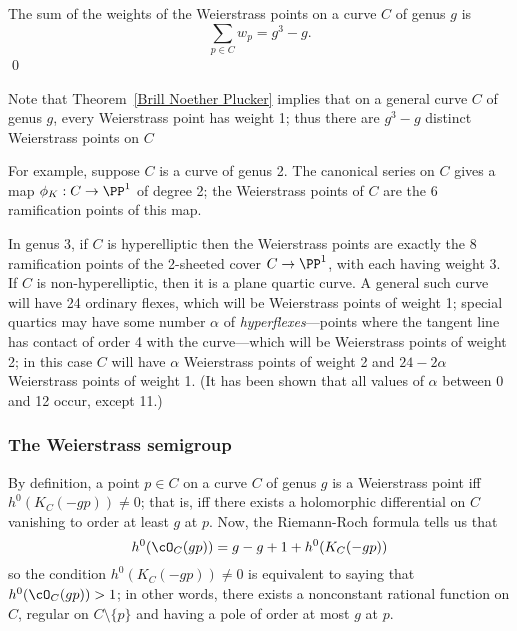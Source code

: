 \begin{corollary}\label{plucker formula}
The sum of the weights of the Weierstrass points on a curve $C$ of genus $g$ is
$$
\sum_{p \in C} w_p = g^3-g.
$$\qed
\end{corollary}

Note that Theorem~\ref{Brill Noether Plucker} implies that on a general curve $C$ of genus $g$, every Weierstrass point has weight 1; thus there are $g^3-g$ distinct Weierstrass points on $C$


For example, suppose $C$ is a curve of genus 2. The canonical series on $C$ gives a map $\phi_K : C \to \PP^1$ of degree 2; the Weierstrass points of $C$ are the 6 ramification points of this map. 

In genus 3, if $C$ is hyperelliptic then the Weierstrass points are exactly the 8 ramification points of the 2-sheeted cover $C \to \PP^1$, with each having weight 3. If $C$ is non-hyperelliptic, then it is a plane quartic curve. A general such curve will have 24 ordinary flexes, which will be Weierstrass points of weight 1; special quartics may have some number $\alpha$ of \emph{hyperflexes}---points where the tangent line has contact of order 4 with the curve---which will be Weierstrass points of weight 2; in this case $C$ will have $\alpha$ Weierstrass points of weight 2 and $24-2\alpha$ Weierstrass points of weight 1. (It has been shown that all values of $\alpha$ between 0 and 12 occur, except 11.)

\subsubsection{The Weierstrass semigroup} 

By definition, a point $p \in C$ on a curve $C$ of genus $g$ is a Weierstrass point iff $h^0(K_C(-gp)) \neq 0$; that is, iff there exists a holomorphic differential on $C$ vanishing to order at least $g$ at $p$. Now, the Riemann-Roch formula tells us that
$$
h^0(\cO_C(gp)) = g - g + 1 + h^0(K_C(-gp))
$$
so the condition $h^0(K_C(-gp)) \neq 0$ is equivalent to saying that $h^0(\cO_C(gp)) > 1$; in other words, there exists a nonconstant rational function on $C$, regular on $C \setminus \{p\}$ and having a pole of order at most $g$ at $p$.

